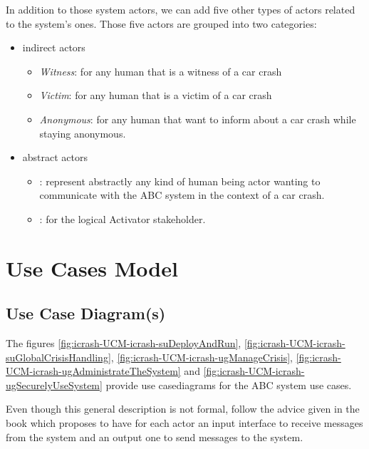 In addition to those system actors, we can add five other types of actors related to the system's ones. Those five actors are grouped into two categories:
\begin{itemize}
  \item \Glspl{indirect actor} 
  \begin{itemize}
    \item \textit{Witness}: for any human that is a witness of a car crash
    \item \textit{Victim}: for any human that is a victim of a car crash
    \item \textit{Anonymous}: for any human that want to inform about a car crash while staying anonymous.
  \end{itemize}
  
  \item \Glspl{abstract actor}
	\begin{itemize}
    \item {}: represent abstractly any kind of human being actor wanting to communicate with the ABC system in the context of a car crash.
    \item {}: for the logical Activator stakeholder.
  \end{itemize}

\end{itemize}


\clearpage
\section{Use Cases Model}
\label{sec:icrash-gendescr-usecasemodel}

\subsection{Use Case Diagram(s)}

The figures \ref{fig:icrash-UCM-icrash-suDeployAndRun}, \ref{fig:icrash-UCM-icrash-suGlobalCrisisHandling}, \ref{fig:icrash-UCM-icrash-ugManageCrisis}, \ref{fig:icrash-UCM-icrash-ugAdministrateTheSystem} and \ref{fig:icrash-UCM-icrash-ugSecurelyUseSystem} provide \msrmessir use casediagrams for the ABC system use cases.

Even though this general description is not formal, follow the advice given in the \msrmessir book \cite{messirbook} which proposes to have for each actor an input interface to receive messages from the system and an output one to send messages to the system.

